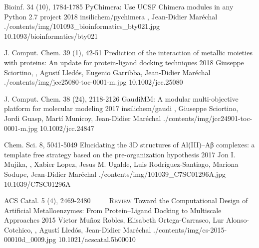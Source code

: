 \begin{cventries}
  \pubentry
    {Bioinf. 34 (10), 1784-1785} %
    {PyChimera: Use UCSF Chimera modules in any Python 2.7 project} %
    {2018} %
    {insilichem/pychimera} %
    {,\textsuperscript{\dagger} Jean-Didier Maréchal\textsuperscript{\dagger}} %
    {./contents/img/101093_bioinformatics_bty021.jpg} %
    {10.1093/bioinformatics/bty021} %

  \pubentry
    {J. Comput. Chem. 39 (1), 42-51} %
    {Prediction of the interaction of metallic moieties with proteins: An update for protein-ligand docking techniques} %
    {2018} %
    {} %
    {Giuseppe Sciortino, , Agustí Lledós, Eugenio Garribba, Jean-Didier Maréchal} %
    {./contents/img/jcc25080-toc-0001-m.jpg} %
    {10.1002/jcc.25080} %

  \pubentry
    {J. Comput. Chem. 38 (24), 2118-2126} %
    {GaudiMM: A modular multi-objective platform for molecular modeling} %
    {2017} %
    {insilichem/gaudi} %
    {,\textsuperscript{\dagger} Giuseppe Sciortino, Jordi Guasp, Martí Municoy, Jean-Didier Maréchal\textsuperscript{\dagger}} %
    {./contents/img/jcc24901-toc-0001-m.jpg} %
    {10.1002/jcc.24847} %

  \pubentry
    {Chem. Sci. 8, 5041-5049} %
    {Elucidating the 3D structures of Al(III)–Aβ complexes: a template free strategy based on the pre-organization hypothesis} %
    {2017} %
    {} %
    {Jon I. Mujika, , Xabier Lopez, Jesus M. Ugalde, Luis Rodríguez-Santiago, Mariona Sodupe, Jean-Didier Maréchal} %
    {./contents/img/101039_C7SC01296A.jpg} %
    {10.1039/C7SC01296A} %

  \pubentry
    {ACS Catal. 5 (4), 2469-2480 ~~\cdot~~ \scshape{Review}} %
    {Toward the Computational Design of Artificial Metalloenzymes: From Protein–Ligand Docking to Multiscale Approaches} %
    {2015} %
    {} %
    {Victor Muñoz Robles, Elisabeth Ortega-Carrasco, Lur Alonso-Cotchico, , Agustí Lledós, Jean-Didier Maréchal} %
    {./contents/img/cs-2015-00010d_0009.jpg} %
    {10.1021/acscatal.5b00010} %
\end{cventries}

